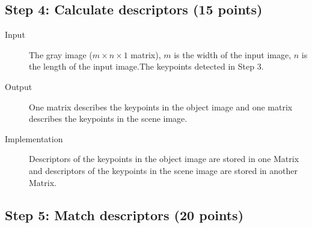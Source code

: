\documentclass[12pt]{article}
\begin{document}
\subsection{Step 4: Calculate descriptors (15 points)}

\begin{description}
\item[Input] The gray image ($m \times n \times 1$ matrix), $m$ is the width of the input image, $n$ is the length of the input image.The keypoints detected in Step 3.
\item[Output] One matrix describes the keypoints in the object image and one matrix describes the keypoints in the scene image.
\item[Implementation] Descriptors of the keypoints in the object image are stored in one Matrix and descriptors of the keypoints in the scene image are stored in another Matrix.
\end{description}

\subsection{Step 5: Match descriptors (20 points)}
\end{document}
